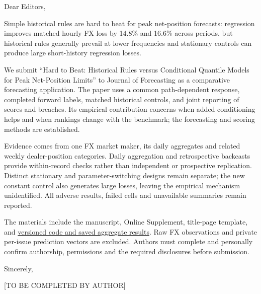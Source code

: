\documentclass[11pt,a4paper]{article}
\begin{document}
Dear Editors,

Simple historical rules are hard to beat for peak net-position forecasts: regression improves matched hourly FX loss by 14.8\% and 16.6\% across periods, but historical rules generally prevail at lower frequencies and stationary controls can produce large short-history regression losses.

We submit “Hard to Beat: Historical Rules versus Conditional Quantile Models for Peak Net-Position Limits” to Journal of Forecasting as a comparative forecasting application. The paper uses a common path-dependent response, completed forward labels, matched historical controls, and joint reporting of scores and breaches. Its empirical contribution concerns when added conditioning helps and when rankings change with the benchmark; the forecasting and scoring methods are established.

Evidence comes from one FX market maker, its daily aggregates and related weekly dealer-position categories. Daily aggregation and retrospective backcasts provide within-record checks rather than independent or prospective replication. Distinct stationary and parameter-switching designs remain separate; the new constant control also generates large losses, leaving the empirical mechanism unidentified. All adverse results, failed cells and unavailable summaries remain reported.

The materials include the manuscript, Online Supplement, title-page template, and \href{https://github.com/ByronLi0207/financial-mathematics-paper-20261020/tree/revision-v9}{versioned code and saved aggregate results}. Raw FX observations and private per-issue prediction vectors are excluded. Authors must complete and personally confirm authorship, permissions and the required disclosures before submission.

Sincerely,

[TO BE COMPLETED BY AUTHOR]
\end{document}
